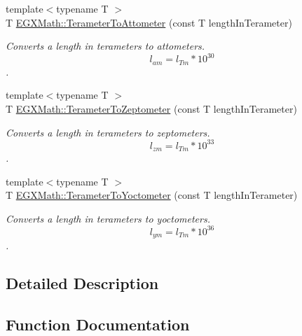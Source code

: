 \begin{DoxyCompactItemize}
{\footnotesize template$<$typename T $>$ }\\T \mbox{\hyperlink{group___e_g_x_math-_conversions-_length_conversions-_terameter-_s_i_ga985f6a434acb7bb9b9ceeaeb55172cdf}{E\+G\+X\+Math\+::\+Terameter\+To\+Attometer}} (const T length\+In\+Terameter)
\begin{DoxyCompactList}\small\item\em Converts a length in terameters to attometers. \[ l_{am}=l_{Tm} * 10^{30} \]. \end{DoxyCompactList}\item 
{\footnotesize template$<$typename T $>$ }\\T \mbox{\hyperlink{group___e_g_x_math-_conversions-_length_conversions-_terameter-_s_i_ga2347b883d209d99cd37a4f273a1c6920}{E\+G\+X\+Math\+::\+Terameter\+To\+Zeptometer}} (const T length\+In\+Terameter)
\begin{DoxyCompactList}\small\item\em Converts a length in terameters to zeptometers. \[ l_{zm}=l_{Tm} * 10^{33} \]. \end{DoxyCompactList}\item 
{\footnotesize template$<$typename T $>$ }\\T \mbox{\hyperlink{group___e_g_x_math-_conversions-_length_conversions-_terameter-_s_i_ga8cdb09d983691434d45c52808465c92f}{E\+G\+X\+Math\+::\+Terameter\+To\+Yoctometer}} (const T length\+In\+Terameter)
\begin{DoxyCompactList}\small\item\em Converts a length in terameters to yoctometers. \[ l_{ym}=l_{Tm} * 10^{36} \]. \end{DoxyCompactList}\end{DoxyCompactItemize}


\subsection{Detailed Description}


\subsection{Function Documentation}
\mbox{\label{group___e_g_x_math-_conversions-_length_conversions-_terameter-_s_i_ga985f6a434acb7bb9b9ceeaeb55172cdf}} 
